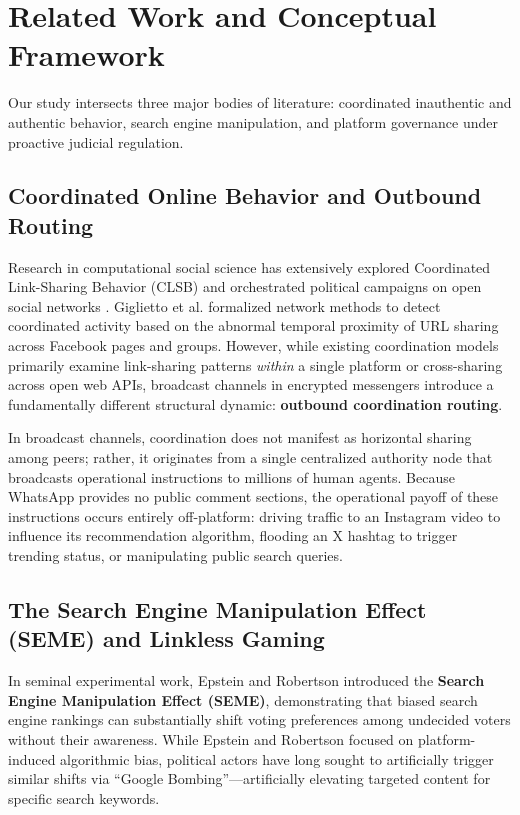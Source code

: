 \documentclass[preprint,12pt]{elsarticle}
\begin{document}
\section{Related Work and Conceptual Framework}\label{sec:related}

Our study intersects three major bodies of literature: coordinated inauthentic and authentic behavior, search engine manipulation, and platform governance under proactive judicial regulation.

\subsection{Coordinated Online Behavior and Outbound Routing}
Research in computational social science has extensively explored Coordinated Link-Sharing Behavior (CLSB) and orchestrated political campaigns on open social networks \cite{giglietto2020coordinated,metaxas2012social}. Giglietto et al. \cite{giglietto2020coordinated} formalized network methods to detect coordinated activity based on the abnormal temporal proximity of URL sharing across Facebook pages and groups. However, while existing coordination models primarily examine link-sharing patterns \textit{within} a single platform or cross-sharing across open web APIs, broadcast channels in encrypted messengers introduce a fundamentally different structural dynamic: \textbf{outbound coordination routing}.

In broadcast channels, coordination does not manifest as horizontal sharing among peers; rather, it originates from a single centralized authority node that broadcasts operational instructions to millions of human agents. Because WhatsApp provides no public comment sections, the operational payoff of these instructions occurs entirely off-platform: driving traffic to an Instagram video to influence its recommendation algorithm, flooding an X hashtag to trigger trending status, or manipulating public search queries.

\subsection{The Search Engine Manipulation Effect (SEME) and Linkless Gaming}
In seminal experimental work, Epstein and Robertson \cite{epstein2015search} introduced the \textbf{Search Engine Manipulation Effect (SEME)}, demonstrating that biased search engine rankings can substantially shift voting preferences among undecided voters without their awareness. While Epstein and Robertson focused on platform-induced algorithmic bias, political actors have long sought to artificially trigger similar shifts via ``Google Bombing''---artificially elevating targeted content for specific search keywords.
\end{document}
